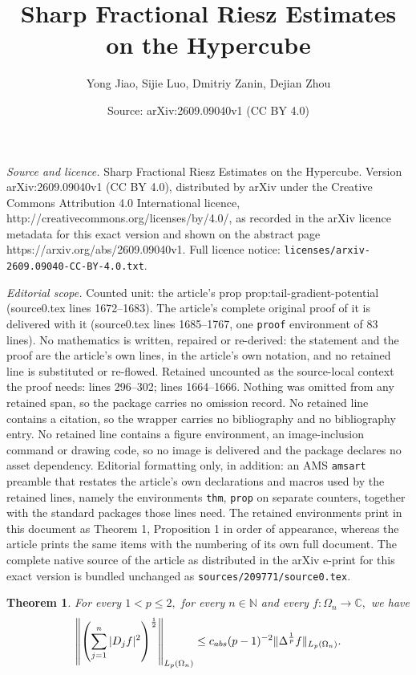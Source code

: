 \documentclass[10pt,a4paper]{amsart}
\title{Sharp Fractional Riesz Estimates on the Hypercube}
\author{Yong Jiao, Sijie Luo, Dmitriy Zanin, Dejian Zhou}
\date{Source: arXiv:2609.09040v1 (CC BY 4.0)}
\newtheorem{thm}{Theorem}
\newcommand{\N}{\mathbb N}
\begin{document}
\maketitle

\noindent\emph{Source and licence.} Sharp Fractional Riesz Estimates on the Hypercube. Version arXiv:2609.09040v1 (CC BY 4.0), distributed by arXiv under the Creative Commons Attribution 4.0 International licence, http://creativecommons.org/licenses/by/4.0/, as recorded in the arXiv licence metadata for this exact version and shown on the abstract page https://arxiv.org/abs/2609.09040v1. Full licence notice: \texttt{licenses/arxiv-2609.09040-CC-BY-4.0.txt}.\par\smallskip

\noindent\textit{Editorial scope.} Counted unit: the article's prop prop:tail-gradient-potential (source0.tex lines 1672--1683). The article's complete original proof of it is delivered with it (source0.tex lines 1685--1767, one \texttt{proof} environment of 83 lines). No mathematics is written, repaired or re-derived: the statement and the proof are the article's own lines, in the article's own notation, and no retained line is substituted or re-flowed.  Retained uncounted as the source-local context the proof needs: lines 296--302; lines 1664--1666.  Nothing was omitted from any retained span, so the package carries no omission record.  No retained line contains a citation, so the wrapper carries no bibliography and no bibliography entry.  No retained line contains a figure environment, an image-inclusion command or drawing code, so no image is delivered and the package declares no asset dependency.  Editorial formatting only, in addition: an AMS \texttt{amsart} preamble that restates the article's own declarations and macros used by the retained lines, namely the environments \texttt{thm}, \texttt{prop} on separate counters, together with the standard packages those lines need.  The retained environments print in this document as Theorem 1, Proposition 1 in order of appearance, whereas the article prints the same items with the numbering of its own full document.  The complete native source of the article as distributed in the arXiv e-print for this exact version is bundled unchanged as \texttt{sources/209771/source0.tex}.
\begin{thm}\label{thm:main}
For every $1<p\leq 2,$ for every
$n\in\N$ and every $f:\Omega_n\to\mathbb{C},$ we have
\[
\left\|\left(\sum_{j=1}^n|D_jf|^2\right)^{\frac12}\right\|_{L_p(\Omega_n)} \leq c_{{\rm abs}}(p-1)^{-2}\|\Delta^{\frac1p}f\|_{L_p(\Omega_n)}.
\]
\end{thm}
\end{document}
